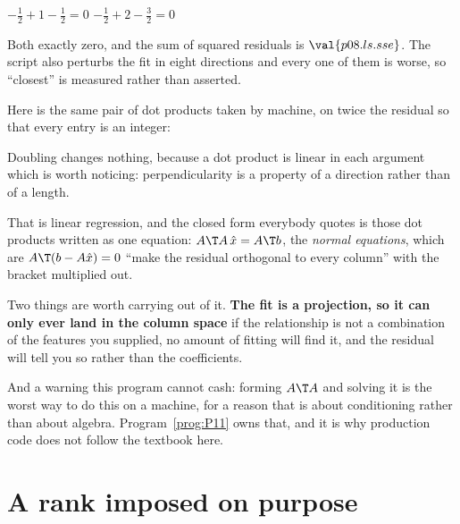 \begin{fr}
\begin{ansblock}
$-\frac{1}{2} + 1 - \frac{1}{2} = 0$ \qquad
$-\frac{1}{2} + 2 - \frac{3}{2} = 0$
\end{ansblock}

Both exactly zero, and the sum of squared residuals is $\val{p08.ls.sse}$. The
script also perturbs the fit in eight directions and every one of them is
worse, so \enquote{closest} is measured rather than asserted.

Here is the same pair of dot products taken by machine, on twice the residual
so that every entry is an integer:


Doubling changes nothing, because a dot product is linear in each argument
\dash{} which is worth noticing: perpendicularity is a property of a direction
rather than of a length.
\end{fr}


\begin{fr}
\begin{aibox}
That is linear regression, and the closed form everybody quotes is those dot
products written as one equation: $A\T A\,\hat{x} = A\T b$, the \emph{normal
equations}, which are $A\T(b - A\hat{x}) = 0$ \dash{} \enquote{make the
residual orthogonal to every column} \dash{} with the bracket multiplied out.

Two things are worth carrying out of it. \textbf{The fit is a projection, so it
can only ever land in the column space} \dash{} if the relationship is not a
combination of the features you supplied, no amount of fitting will find it,
and the residual will tell you so rather than the coefficients.

And a warning this program cannot cash: forming $A\T A$ and solving it is the
worst way to do this on a machine, for a reason that is about conditioning
rather than about algebra. Program~\ref{prog:P11} owns that, and it is why
production code does not follow the textbook here.
\end{aibox}
\end{fr}

\section{A rank imposed on purpose}
\label{sec:P08-low-rank}

